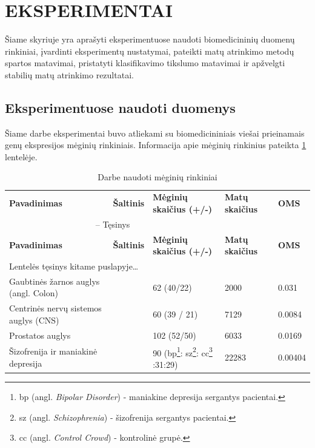 \section{EKSPERIMENTAI}
\label{eksperimentai}

Šiame skyriuje yra aprašyti eksperimentuose naudoti biomedicininių duomenų rinkiniai, įvardinti eksperimentų nustatymai, pateikti matų atrinkimo metodų spartos matavimai, pristatyti klasifikavimo tikslumo matavimai ir apžvelgti stabilių matų atrinkimo rezultatai. 

\subsection{Eksperimentuose naudoti duomenys}
\label{eksperimentuose_naudoti_duomenys}

Šiame darbe eksperimentai buvo atliekami su biomedicininiais viešai prieinamais genų ekspresijos mėginių rinkiniais. Informacija apie mėginių rinkinius pateikta \ref{table:datasets} lentelėje.
\begin{longtable}{|p{4.5cm}|p{2cm}|p{3.5cm}|p{2.3cm}|p{2cm}|}
\captionsetup{labelsep=period}
\caption{Darbe naudoti mėginių rinkiniai\label{table:datasets}}\\
\hline \hline
{\textbf{Pavadinimas}} &
{\textbf{Šaltinis}} &
{\textbf{Mėginių skaičius (+/-)}} &
{\textbf{Matų \newline skaičius}} &
{\textbf{OMS}}\\
\hline
\endfirsthead
\multicolumn{3}{c}{{\tablename} \thetable{} -- Tęsinys} \\[0.5ex]
\hline \hline
{\textbf{Pavadinimas}} &
{\textbf{Šaltinis}} &
{\textbf{Mėginių skaičius (+/-)}}&
{\textbf{Matų \newline skaičius}} &
{\textbf{OMS}}\\
\hline
\endhead
\multicolumn{3}{l}{{Lentelės tęsinys kitame puslapyje\ldots}} \\
\endfoot
\hline \hline
\endlastfoot
\hline 
Gaubtinės žarnos auglys (angl. Colon) 
& 
\cite{alon1999broad} 
& 
62 (40/22) 
& 
2000 
& 
0.031 \\
\hline
Centrinės nervų sistemos auglys (CNS) 
& 
\cite{pomeroy2002prediction} 
& 
60 (39 / 21) 
& 
7129 
& 
0.0084 \\
\hline
Prostatos auglys 
& 
\cite{singh2002gene} 
& 
102 (52/50) 
& 
6033 
& 
0.0169 \\
\hline
Šizofrenija ir maniakinė depresija
&
\cite{altara}
&
90 \newline (bp\footnote{bp (angl. \textit{Bipolar Disorder}) - maniakine depresija sergantys pacientai.}:
sz\footnote{sz (angl. \textit{Schizophrenia}) - šizofrenija sergantys pacientai.}:
cc\footnote{cc (angl. \textit{Control Crowd}) - kontrolinė grupė.} \newline =30:31:29)
&
22283
&
0.00404 \\
\hline
\end{longtable}

